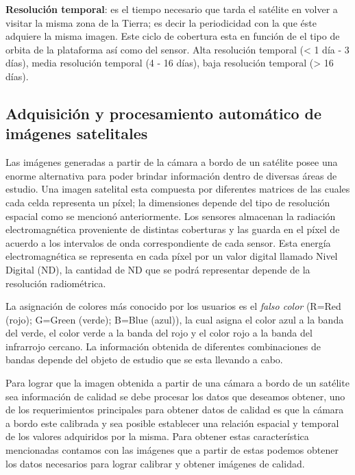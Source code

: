 \par \textbf{Resolución temporal}: es el tiempo necesario que tarda el satélite en volver a visitar la misma zona de la Tierra; es decir la periodicidad con la que éste adquiere la misma imagen. Este ciclo de cobertura esta en función de el tipo de orbita de la plataforma así como del sensor. Alta resolución temporal (< 1 día - 3 días), media resolución temporal (4 - 16 días), baja resolución temporal (> 16 días).


\subsection{Adquisición y procesamiento automático de imágenes satelitales}\label{sub:imagen_satelital}

Las imágenes generadas a partir de la cámara a bordo de un satélite posee una enorme alternativa para poder brindar información dentro de diversas áreas de estudio. Una imagen satelital esta compuesta por diferentes matrices de las cuales cada celda representa un píxel; la dimensiones  depende del tipo de resolución espacial como se mencionó anteriormente. Los sensores almacenan la radiación electromagnética proveniente de distintas coberturas y las guarda en el píxel de acuerdo a los intervalos de onda correspondiente de cada sensor. Esta energía electromagnética se representa en cada píxel por un valor digital llamado Nivel Digital (ND), la cantidad de ND que se podrá representar depende de la resolución radiométrica.

La asignación de colores más conocido por los usuarios es el \textit{falso color} (R=Red (rojo); G=Green (verde); B=Blue (azul)), la cual asigna el color azul a la banda del verde, el color verde a la banda del rojo y el color rojo a la banda del infrarrojo cercano. La información obtenida de diferentes combinaciones de bandas depende del objeto de estudio que se esta llevando a cabo.


Para lograr que la imagen obtenida a partir de una cámara a bordo de un satélite sea información de calidad se debe procesar los datos que deseamos obtener, uno de los requerimientos principales para obtener datos de calidad es que la cámara a bordo este calibrada y sea posible establecer una relación espacial y temporal de los valores adquiridos por la misma. Para obtener estas característica mencionadas contamos con las imágenes que a partir de estas podemos obtener los datos necesarios para lograr calibrar y obtener imágenes de calidad. 

